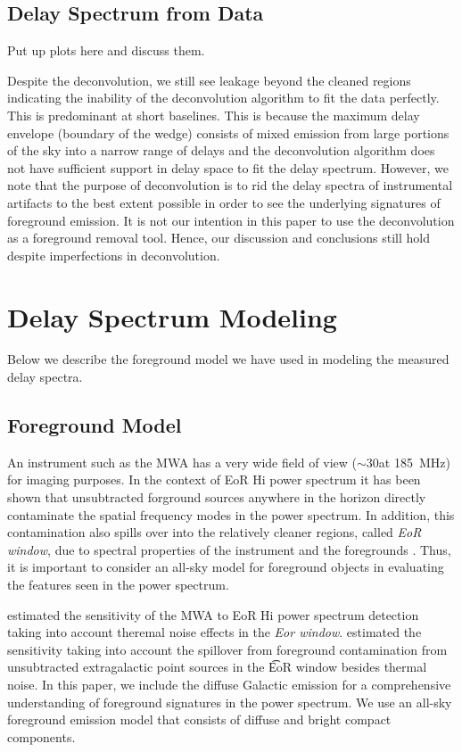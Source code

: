 \documentclass[preprint2,iop,numberedappendix]{emulateapj}
\begin{document}
\subsection{Delay Spectrum from Data}\label{sec:data-delay-spectrum}

Put up plots here and discuss them.

Despite the deconvolution, we still see leakage beyond the cleaned regions indicating the inability of the deconvolution algorithm to fit the data perfectly. This is predominant at short baselines. This is because the maximum delay envelope (boundary of the wedge) consists of mixed emission from large portions of the sky into a narrow range of delays and the deconvolution algorithm does not have sufficient support in delay space to fit the delay spectrum. However, we note that the purpose of deconvolution is to rid the delay spectra of instrumental artifacts to the best extent possible in order to see the underlying signatures of foreground emission. It is not our intention in this paper to use the deconvolution as a foreground removal tool. Hence, our discussion and conclusions still hold despite imperfections in deconvolution.

\section{Delay Spectrum Modeling}\label{sec:modeling}

Below we describe the foreground model we have used in modeling the measured delay spectra. 

\subsection{Foreground Model}\label{sec:foreground}

An instrument such as the MWA has a very wide field of view ($\sim 30$\arcdeg at 185~MHz) for imaging purposes. In the context of EoR H{\sc i} power spectrum it has been shown that unsubtracted forground sources anywhere in the horizon directly contaminate the spatial frequency modes in the power spectrum. In addition, this contamination also spills over into the relatively cleaner regions, called {\it EoR window}, due to spectral properties of the instrument and the foregrounds \citep{thy13,pob13,ved12,par12}. Thus, it is important to consider an all-sky model for foreground objects in evaluating the features seen in the power spectrum. 

\citet{bea13} estimated the sensitivity of the MWA to EoR H{\sc i} power spectrum detection taking into account theremal noise effects in the {\it Eor window}. \citet{thy13} estimated the sensitivity taking into account the spillover from foreground contamination from unsubtracted extragalactic point sources in the {\t EoR window} besides thermal noise. In this paper, we include the diffuse Galactic emission for a comprehensive understanding of foreground signatures in the power spectrum. We use an all-sky foreground emission model that consists of diffuse and bright compact components. 
\end{document}
